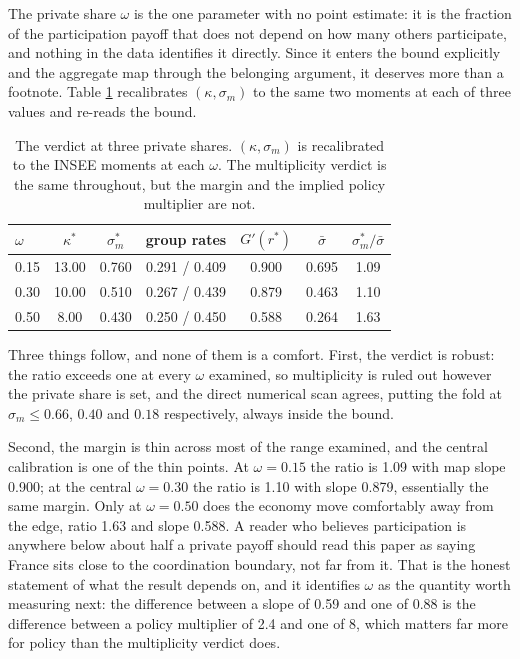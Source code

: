 \documentclass[11pt]{article}
\begin{document}
The private share $\omega$ is the one parameter with no point estimate: it is the fraction of the participation payoff that does not depend on how many others participate, and nothing in the data identifies it directly. Since it enters the bound explicitly and the aggregate map through the belonging argument, it deserves more than a footnote. Table \ref{tab:omega} recalibrates $(\kappa, \sigma_m)$ to the same two moments at each of three values and re-reads the bound.

\begin{table}[t]
\centering
\caption{The verdict at three private shares. $(\kappa, \sigma_m)$ is recalibrated to the INSEE moments at each $\omega$. The multiplicity verdict is the same throughout, but the margin and the implied policy multiplier are not.}
\label{tab:omega}
\begin{tabular}{lcccccc}
\hline
$\omega$ & $\kappa^*$ & $\sigma_m^*$ & group rates & $G'(r^*)$ & $\bar\sigma$ & $\sigma_m^*/\bar\sigma$ \\
\hline
0.15 & 13.00 & 0.760 & 0.291 / 0.409 & 0.900 & 0.695 & 1.09 \\
0.30 & 10.00 & 0.510 & 0.267 / 0.439 & 0.879 & 0.463 & 1.10 \\
0.50 & 8.00 & 0.430 & 0.250 / 0.450 & 0.588 & 0.264 & 1.63 \\
\hline
\end{tabular}
\end{table}

Three things follow, and none of them is a comfort. First, the verdict is robust: the ratio exceeds one at every $\omega$ examined, so multiplicity is ruled out however the private share is set, and the direct numerical scan agrees, putting the fold at $\sigma_m \le 0.66$, $0.40$ and $0.18$ respectively, always inside the bound.

Second, the margin is thin across most of the range examined, and the central calibration is one of the thin points. At $\omega = 0.15$ the ratio is 1.09 with map slope 0.900; at the central $\omega = 0.30$ the ratio is 1.10 with slope 0.879, essentially the same margin. Only at $\omega = 0.50$ does the economy move comfortably away from the edge, ratio 1.63 and slope 0.588. A reader who believes participation is anywhere below about half a private payoff should read this paper as saying France sits close to the coordination boundary, not far from it. That is the honest statement of what the result depends on, and it identifies $\omega$ as the quantity worth measuring next: the difference between a slope of 0.59 and one of 0.88 is the difference between a policy multiplier of 2.4 and one of 8, which matters far more for policy than the multiplicity verdict does.
\end{document}
